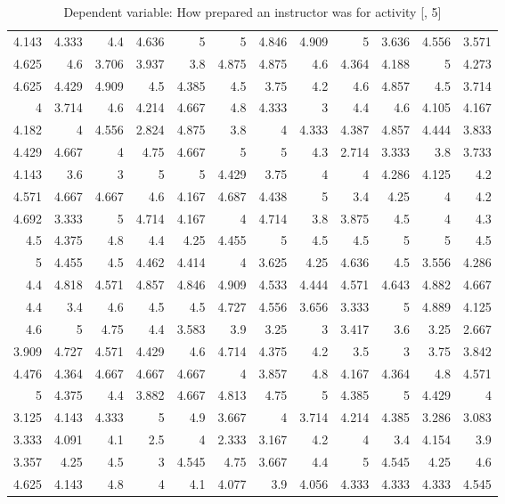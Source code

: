 \documentclass[10pt]{report}
\begin{document}
\begin{table}
\begin{tabular}{rrrrrrrrrrrr}
	4.143 & 4.333 & 4.4   & 4.636 & 5     & 5     & 4.846 & 4.909 & 5     & 3.636 & 4.556 & 3.571 \\
	4.625 & 4.6   & 3.706 & 3.937 & 3.8   & 4.875 & 4.875 & 4.6   & 4.364 & 4.188 & 5     & 4.273 \\
	4.625 & 4.429 & 4.909 & 4.5   & 4.385 & 4.5   & 3.75  & 4.2   & 4.6   & 4.857 & 4.5   & 3.714 \\
	4     & 3.714 & 4.6   & 4.214 & 4.667 & 4.8   & 4.333 & 3     & 4.4   & 4.6   & 4.105 & 4.167 \\
	4.182 & 4     & 4.556 & 2.824 & 4.875 & 3.8   & 4     & 4.333 & 4.387 & 4.857 & 4.444 & 3.833 \\
	4.429 & 4.667 & 4     & 4.75  & 4.667 & 5     & 5     & 4.3   & 2.714 & 3.333 & 3.8   & 3.733 \\
	4.143 & 3.6   & 3     & 5     & 5     & 4.429 & 3.75  & 4     & 4     & 4.286 & 4.125 & 4.2   \\
	4.571 & 4.667 & 4.667 & 4.6   & 4.167 & 4.687 & 4.438 & 5     & 3.4   & 4.25  & 4     & 4.2   \\
	4.692 & 3.333 & 5     & 4.714 & 4.167 & 4     & 4.714 & 3.8   & 3.875 & 4.5   & 4     & 4.3   \\
	4.5   & 4.375 & 4.8   & 4.4   & 4.25  & 4.455 & 5     & 4.5   & 4.5   & 5     & 5     & 4.5   \\
	5     & 4.455 & 4.5   & 4.462 & 4.414 & 4     & 3.625 & 4.25  & 4.636 & 4.5   & 3.556 & 4.286 \\
	4.4   & 4.818 & 4.571 & 4.857 & 4.846 & 4.909 & 4.533 & 4.444 & 4.571 & 4.643 & 4.882 & 4.667 \\
	4.4   & 3.4   & 4.6   & 4.5   & 4.5   & 4.727 & 4.556 & 3.656 & 3.333 & 5     & 4.889 & 4.125 \\
	4.6   & 5     & 4.75  & 4.4   & 3.583 & 3.9   & 3.25  & 3     & 3.417 & 3.6   & 3.25  & 2.667 \\
	3.909 & 4.727 & 4.571 & 4.429 & 4.6   & 4.714 & 4.375 & 4.2   & 3.5   & 3     & 3.75  & 3.842 \\
	4.476 & 4.364 & 4.667 & 4.667 & 4.667 & 4     & 3.857 & 4.8   & 4.167 & 4.364 & 4.8   & 4.571 \\
	5     & 4.375 & 4.4   & 3.882 & 4.667 & 4.813 & 4.75  & 5     & 4.385 & 5     & 4.429 & 4     \\
	3.125 & 4.143 & 4.333 & 5     & 4.9   & 3.667 & 4     & 3.714 & 4.214 & 4.385 & 3.286 & 3.083 \\
	3.333 & 4.091 & 4.1   & 2.5   & 4     & 2.333 & 3.167 & 4.2   & 4     & 3.4   & 4.154 & 3.9   \\
	3.357 & 4.25  & 4.5   & 3     & 4.545 & 4.75  & 3.667 & 4.4   & 5     & 4.545 & 4.25  & 4.6   \\
	4.625 & 4.143 & 4.8   & 4     & 4.1   & 4.077 & 3.9   & 4.056 & 4.333 & 4.333 & 4.333 & 4.545 \\
	\hline
	\end{tabular}

    \caption{Dependent variable: How prepared an instructor was for activity [, 5]}
\end{table}
\end{document}
